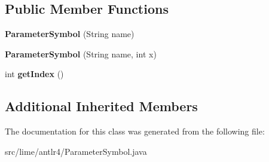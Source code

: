 \subsection*{Public Member Functions}
\begin{DoxyCompactItemize}
\item 
\mbox{\label{classlime_1_1antlr4_1_1ParameterSymbol_aa8ec0fac38a490effa99255c9b778a19}} 
{\bfseries Parameter\+Symbol} (String name)
\item 
\mbox{\label{classlime_1_1antlr4_1_1ParameterSymbol_a4108c6c62a6011ca3def25251ab48cc9}} 
{\bfseries Parameter\+Symbol} (String name, int x)
\item 
\mbox{\label{classlime_1_1antlr4_1_1ParameterSymbol_a57485eeee8a27fceec82e9aaa0a3b3ab}} 
int {\bfseries get\+Index} ()
\end{DoxyCompactItemize}
\subsection*{Additional Inherited Members}


The documentation for this class was generated from the following file\+:\begin{DoxyCompactItemize}
\item 
src/lime/antlr4/Parameter\+Symbol.\+java\end{DoxyCompactItemize}

